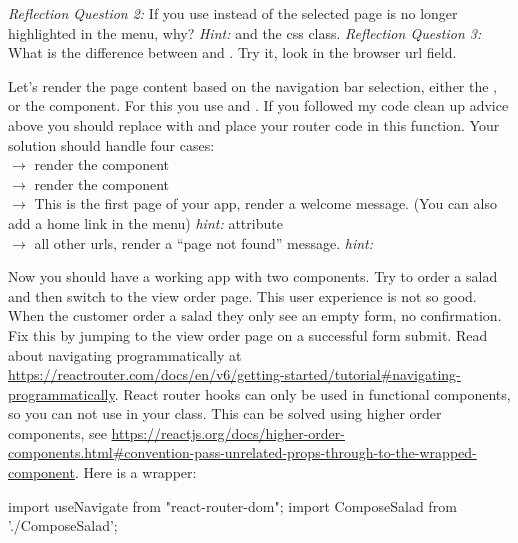 \documentclass[fleqn, article, a4paper]{memoir}
\begin{document}
\begin{Assignments}
\noindent \emph{Reflection Question 2:} If you use  instead of  the selected page is no longer highlighted in the menu, why? \emph{Hint:}  and the  css class.
\noindent \emph{Reflection Question 3:} What is the difference between  and . Try it, look in the browser url field.

\item Let's render the page content based on the navigation bar selection, either the , or the  component. For this you use  and . If you followed my code clean up advice above you should replace  with  and place your router code in this function. Your solution should handle four cases:
\\  $\rightarrow$ render the  component
\\  $\rightarrow$ render the  component
\\  $\rightarrow$ This is the first page of your app, render a welcome message. (You can also add a home link in the menu) \emph{hint:}  attribute
\\  $\rightarrow$ all other urls, render a ``page not found'' message. \emph{hint:} 

\item Now you should have a working app with two components. Try to order a salad and then switch to the view order page. This user experience is not so good. When the customer order a salad they only see an empty form, no confirmation. Fix this by jumping to the view order page on a successful form submit. Read about navigating programmatically at \url{https://reactrouter.com/docs/en/v6/getting-started/tutorial#navigating-programmatically}. React router hooks can only be used in functional components, so you can not use  in your  class. This can be solved using higher order components, see \url{https://reactjs.org/docs/higher-order-components.html#convention-pass-unrelated-props-through-to-the-wrapped-component}. Here is a wrapper:
\begin{Code}
import { useNavigate } from "react-router-dom";
import ComposeSalad from './ComposeSalad';


\end{Code}
\end{Assignments}
\end{document}
